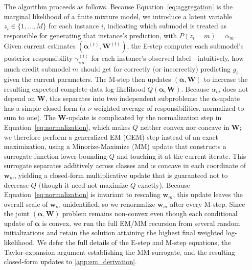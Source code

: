 \documentclass[11pt]{elsarticle}
\begin{document}
The algorithm proceeds as follows. Because Equation~\ref{eq:aggregation} is the marginal likelihood of a finite mixture model, we introduce a latent variable $z_i \in \{1, \ldots, M\}$ for each instance $i$, indicating which submodel is treated as responsible for generating that instance's prediction, with $P(z_i = m) = \alpha_m$. Given current estimates $(\bm{\alpha}^{(t)}, \bm{W}^{(t)})$, the E-step computes each submodel's posterior responsibility $\gamma_{im}^{(t)}$ for each instance's observed label---intuitively, how much credit submodel $m$ should get for correctly (or incorrectly) predicting $y_i$ given the current parameters. The M-step then updates $(\bm{\alpha}, \bm{W})$ to increase the resulting expected complete-data log-likelihood $Q(\bm{\alpha}, \bm{W})$. Because $\alpha_m$ does not depend on $\bm{W}$, this separates into two independent subproblems: the $\bm{\alpha}$-update has a simple closed form (a $\nu$-weighted average of responsibilities, normalized to sum to one). The $\bm{W}$-update is complicated by the normalization step in Equation~\ref{eq:normalization}, which makes $Q$ neither convex nor concave in $\bm{W}$; we therefore perform a generalized EM (GEM) step instead of an exact maximization, using a Minorize-Maximize (MM) update \citep{hunterlange2004mm} that constructs a surrogate function lower-bounding $Q$ and touching it at the current iterate. This surrogate separates additively across classes and is concave in each coordinate of $\bm{w}_m$, yielding a closed-form multiplicative update that is guaranteed not to decrease $Q$ (though it need not maximize $Q$ exactly). Because Equation~\ref{eq:normalization} is invariant to rescaling $\bm{w}_m$, this update leaves the overall scale of $\bm{w}_m$ unidentified, so we renormalize $\bm{w}_m$ after every M-step. Since the joint $(\bm{\alpha}, \bm{W})$ problem remains non-convex even though each conditional update of $\bm{\alpha}$ is convex, we run the full EM/MM recursion from several random initializations and retain the solution attaining the highest final weighted log-likelihood. We defer the full details of the E-step and M-step equations, the Taylor-expansion argument establishing the MM surrogate, and the resulting closed-form updates to \ref{app:em_derivation}.
\end{document}
